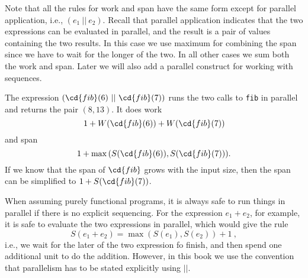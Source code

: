 \begin{cluster}
\label{grp:grm:analysis::models::rules}

\begin{gram}
\label{grm:analysis::models::rules}
Note that all the rules for work and span 
have the same form except for parallel application, i.e., $(e_1\ ||\ e_2)$.    
Recall that parallel application indicates that the two 
expressions can be evaluated in parallel, and the result is a pair of values 
containing the two results. 
In this case we use maximum for combining the span since we have
to wait for the longer of the two.   In all other
cases we sum both the work and span.
Later we will also add a parallel construct for working with
sequences.

\end{gram}
\end{cluster}

\begin{flex}
\label{grp:xmpl:analysis::models::expression}

\begin{example}
\label{xmpl:analysis::models::expression}
The expression $(\cd{fib}(6)\ ||\ \cd{fib}(7))$ runs the two
calls to {\tt fib} in parallel and returns the pair $(8,13)$.   It
does work 
\[
1 + W(\cd{fib}(6)) + W(\cd{fib}(7))
\] 
and span
\[
1 + \max{}(S(\cd{fib}(6)), S(\cd{fib}(7))).
\]   
If we know that the
span of $\cd{fib}$ grows with the input size, then the span can
be simplified to $1 + S(\cd{fib}(7))$.

\end{example}
\end{flex}

\begin{cluster}
\label{grp:rmrk:analysis::models::assuming}

\begin{remark}
\label{rmrk:analysis::models::assuming}
When assuming purely functional programs, it is
always safe to run things in parallel if there is no explicit
sequencing.     For the expression $e_1 + e_2$, for example, it is
safe to evaluate the
two expressions in parallel, which would give the rule
\[
S(e_1 + e_2) = \max{}(S(e_1), S(e_2)) + 1~,
\]
i.e., we wait for the later of the two expression fo finish, and then spend one
additional unit to do the addition.
However, in this book we use the convention that parallelism has to be stated
explicitly using $||$.

\end{remark}
\end{cluster}

